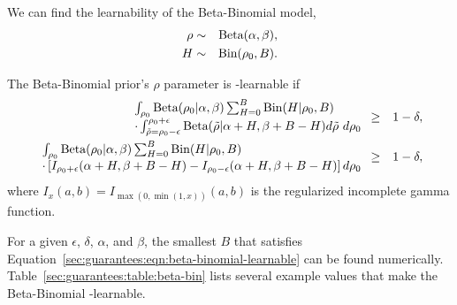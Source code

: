 \begin{example}

\label{sec:guarantees:beta-bin}

We can find the learnability of the Beta-Binomial model,
\begin{eqnarray}
\label{sec:guarantees:eqn:beta-bin-beta}
\rho &\sim& \mbox{Beta}(\alpha,\beta),\\
\label{sec:guarantees:eqn:beta-bin-bin}
H &\sim& \mbox{Bin}(\rho_0, B).
\end{eqnarray}

The Beta-Binomial prior's $\rho$ parameter is \bed-learnable if
\begin{eqnarray}
\begin{array}{l}
\int_{\rho_0} \dBeta(\rho_0|\alpha,\beta)
 \sum_{H=0}^B \dBin(H|\rho_0,B)\\
 \cdot
  \int_{\tilde\rho=\rho_0-\epsilon}^{\rho_0+\epsilon} \dBeta(\tilde\rho|\alpha+H,\beta+B-H)
   d\tilde\rho \
  d\rho_0
  \end{array}
&\geq& 1-\delta,\\
%
\label{sec:guarantees:eqn:beta-binomial-learnable}
\begin{array}{l}
\int_{\rho_0} \dBeta(\rho_0|\alpha,\beta)
 \sum_{H=0}^B \dBin(H|\rho_0,B)\\
  \cdot \left[
   I_{\rho_0+\epsilon}(\alpha+H,\beta+B-H)
   -I_{\rho_0-\epsilon}(\alpha+H,\beta+B-H)
  \right]
  d\rho_0
\end{array}
&\geq& 1-\delta,
\end{eqnarray}
where $I_x(a,b)=I_{\max(0, \min(1, x))}(a,b)$ is the regularized incomplete gamma function.

For a given $\epsilon$, $\delta$, $\alpha$, and $\beta$, the smallest $B$ that satisfies Equation~\ref{sec:guarantees:eqn:beta-binomial-learnable} can be found numerically. Table~\ref{sec:guarantees:table:beta-bin} lists several example values that make the Beta-Binomial \bed-learnable.


\begin{table}
\caption{Learnability of a Beta-Binomial. Using the model from Section~\ref{sec:guarantees:beta-bin}, the posterior for the latent variable $\rho$ is $\epsilon$-accurate with probability at least $1-\delta$ if $B$ is above some threshold. This table gives examples of the relations between the model hyperparameters, $\epsilon$, $\delta$, and $B$. These values are a bit suspect, just wrote the code to find them. }
\label{sec:guarantees:table:beta-bin}
\\
\end{table}


\end{example}
